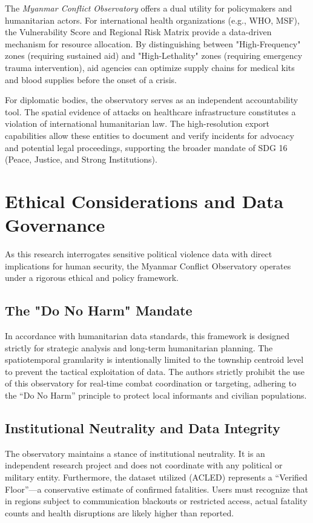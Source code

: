 \documentclass[conference]{IEEEtran}
\begin{document}
The \textit{Myanmar Conflict Observatory} offers a dual utility for policymakers and humanitarian actors. For international health organizations (e.g., WHO, MSF), the Vulnerability Score and Regional Risk Matrix provide a data-driven mechanism for resource allocation. By distinguishing between "High-Frequency" zones (requiring sustained aid) and "High-Lethality" zones (requiring emergency trauma intervention), aid agencies can optimize supply chains for medical kits and blood supplies before the onset of a crisis.

For diplomatic bodies, the observatory serves as an independent accountability tool. The spatial evidence of attacks on healthcare infrastructure constitutes a violation of international humanitarian law. The high-resolution export capabilities allow these entities to document and verify incidents for advocacy and potential legal proceedings, supporting the broader mandate of SDG 16 (Peace, Justice, and Strong Institutions).


\section{Ethical Considerations and Data Governance}

As this research interrogates sensitive political violence data with direct implications for human security, the Myanmar Conflict Observatory operates under a rigorous ethical and policy framework.

\subsection{The "Do No Harm" Mandate}

In accordance with humanitarian data standards, this framework is designed strictly for strategic analysis and long-term humanitarian planning. The spatiotemporal granularity is intentionally limited to the township centroid level to prevent the tactical exploitation of data. The authors strictly prohibit the use of this observatory for real-time combat coordination or targeting, adhering to the ``Do No Harm'' principle to protect local informants and civilian populations.

\subsection{Institutional Neutrality and Data Integrity}

The observatory maintains a stance of institutional neutrality. It is an independent research project and does not coordinate with any political or military entity. Furthermore, the dataset utilized (ACLED) represents a ``Verified Floor''—a conservative estimate of confirmed fatalities. Users must recognize that in regions subject to communication blackouts or restricted access, actual fatality counts and health disruptions are likely higher than reported.
\end{document}
